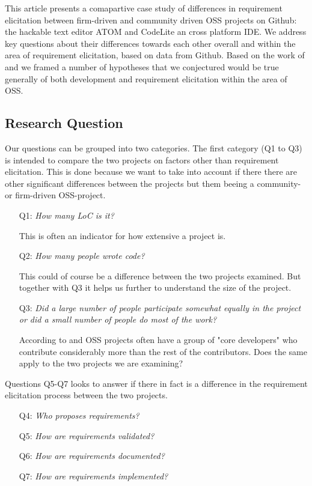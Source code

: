 \documentclass[a4paper,11pt]{article}
\begin{document}
{This article presents a comapartive case study of differences in requirement elicitation between firm-driven and community driven OSS projects on Github: the hackable text editor ATOM and CodeLite an cross platform IDE. We address key questions about their differences towards each other overall and within the area of requirement elicitation, based on data from Github. Based on the work of \cite{Mockus2002a} and \cite{Noll} we framed a number of hypotheses that we conjectured would be true generally of both development and requirement elicitation within the area of OSS. 


\subsection{Research Question}
Our questions can be grouped into two categories. The first category (Q1 to Q3) is intended to compare the two projects on factors other than requirement elicitation. This is done because we want to take into account if there there are other significant differences between the projects but them beeing a community- or firm-driven OSS-project.
\begin{itemize}
	\item[Q1:]\emph{How many LoC is it?}
	
	This is often an indicator for how extensive a project is.
	\item[Q2:]\emph{How many people wrote code?}
	
	This could of course be a difference between the two projects examined. But together with Q3 it helps us further to understand the size of the project.
	\item[Q3:]\emph{Did a large number of people participate somewhat equally in the project or did a small number of people do most of the work?}
	
	According to \cite{Noll} and \cite{Mockus2002a} OSS projects often have a group of "core developers" who contribute considerably more than the rest of the contributors. Does the same apply to the two projects we are examining?
\end{itemize}
Questions Q5-Q7 looks to answer if there in fact is a difference in the requirement elicitation process between the two projects.
\begin{itemize}
	\item[Q4:]\emph{Who proposes requirements?}
	\item[Q5:]\emph{How are requirements validated?}
	\item[Q6:]\emph{How are requirements documented?}
	\item[Q7:]\emph{How are requirements implemented?}
\end{itemize}

}
\end{document}

